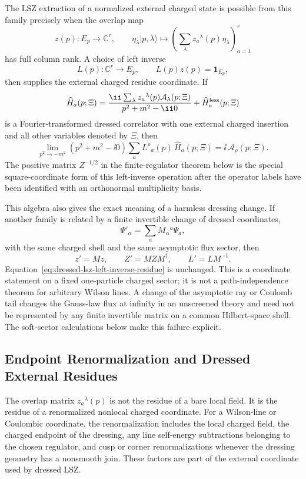 The LSZ extraction of a normalized external charged state is possible from
this family precisely when the overlap map
\[
  z(p):E_p\longrightarrow \mathbb C^r,
  \qquad
  \eta_\lambda |p,\lambda\rangle
  \longmapsto
  \left(\sum_{\lambda}z_a{}^\lambda(p)\eta_\lambda\right)_{a=1}^r
\]
has full column rank.  A choice of left inverse
\[
  L(p):\mathbb C^r\longrightarrow E_p,
  \qquad L(p)z(p)=\mathbf 1_{E_p},
\]
then supplies the external charged residue coordinate.  If
\[
  \widehat H_a(p;\Xi)
  =
  \frac{\ii\sum_{\lambda}z_a{}^\lambda(p)\mathcal A_\lambda(p;\Xi)}
       {p^2+m^2-\ii0}
  +\widehat H_a^{\rm less}(p;\Xi)
\]
is a Fourier-transformed dressed correlator with one external charged
insertion and all other variables denoted by \(\Xi\), then
\begin{equation}
  \lim_{p^2\to -m^2}
  (p^2+m^2-\ii0)
  \sum_a L^\rho{}_a(p)\,\widehat H_a(p;\Xi)
  =
  \ii\,\mathcal A_\rho(p;\Xi).
  \label{eq:dressed-lsz-left-inverse-residue}
\end{equation}
The positive matrix \(Z^{-1/2}\) in the finite-regulator theorem below is the
special square-coordinate form of this left-inverse operation after the
operator labels have been identified with an orthonormal multiplicity basis.

This algebra also gives the exact meaning of a harmless dressing change.  If
another family is related by a finite invertible change of dressed
coordinates,
\[
  \Psi'_\alpha=\sum_a M_\alpha{}^a\Psi_a ,
\]
with the same charged shell and the same asymptotic flux sector, then
\[
  z'=Mz,\qquad Z'=MZM^\dagger,\qquad L'=LM^{-1}.
\]
Equation~\eqref{eq:dressed-lsz-left-inverse-residue} is unchanged.  This is a
coordinate statement on a fixed one-particle charged sector; it is not a
path-independence theorem for arbitrary Wilson lines.  A change of the
asymptotic ray or Coulomb tail changes the Gauss-law flux at infinity in an
unscreened theory and need not be represented by any finite invertible matrix
on a common Hilbert-space shell.  The soft-sector calculations below make this
failure explicit.

\subsection{Endpoint Renormalization and Dressed External Residues}

The overlap matrix \(z_a{}^\lambda(p)\) is not the residue of a bare local
field.  It is the residue of a renormalized nonlocal charged coordinate.  For
a Wilson-line or Coulombic coordinate, the renormalization includes the local
charged field, the charged endpoint of the dressing, any line self-energy
subtractions belonging to the chosen regulator, and cusp or corner
renormalizations whenever the dressing geometry has a nonsmooth join.  These
factors are part of the external coordinate used by dressed LSZ.

